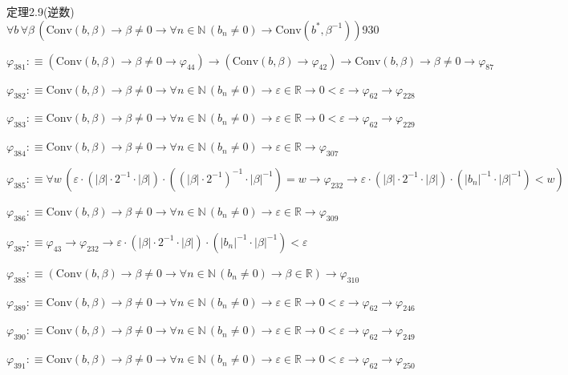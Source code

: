 \begin{fullproof}{定理2.9(逆数)}{$\forall b\,\forall \beta\,(\mathrm{Conv}(b,\beta) \to \beta \neq 0 \to \forall n \in \mathbb{N}\,(b_{n} \neq 0) \to \mathrm{Conv}(b^{\ast},\beta^{-1}))$}{930}
\begin{abbrevlist}
\item $\varphi_{381} :\equiv (\mathrm{Conv}(b,\beta) \to \beta \neq 0 \to \varphi_{44}) \to (\mathrm{Conv}(b,\beta) \to \varphi_{42}) \to \mathrm{Conv}(b,\beta) \to \beta \neq 0 \to \varphi_{87}$
\item $\varphi_{382} :\equiv \mathrm{Conv}(b,\beta) \to \beta \neq 0 \to \forall n \in \mathbb{N}\,(b_{n} \neq 0) \to \varepsilon \in \mathbb{R} \to 0 < \varepsilon \to \varphi_{62} \to \varphi_{228}$
\item $\varphi_{383} :\equiv \mathrm{Conv}(b,\beta) \to \beta \neq 0 \to \forall n \in \mathbb{N}\,(b_{n} \neq 0) \to \varepsilon \in \mathbb{R} \to 0 < \varepsilon \to \varphi_{62} \to \varphi_{229}$
\item $\varphi_{384} :\equiv \mathrm{Conv}(b,\beta) \to \beta \neq 0 \to \forall n \in \mathbb{N}\,(b_{n} \neq 0) \to \varepsilon \in \mathbb{R} \to \varphi_{307}$
\item $\varphi_{385} :\equiv \forall w\,(\varepsilon \cdot (\lvert \beta \rvert \cdot 2^{-1} \cdot \lvert \beta \rvert) \cdot ((\lvert \beta \rvert \cdot 2^{-1})^{-1} \cdot \lvert \beta \rvert^{-1}) = w \to \varphi_{232} \to \varepsilon \cdot (\lvert \beta \rvert \cdot 2^{-1} \cdot \lvert \beta \rvert) \cdot (\lvert b_{n} \rvert^{-1} \cdot \lvert \beta \rvert^{-1}) < w)$
\item $\varphi_{386} :\equiv \mathrm{Conv}(b,\beta) \to \beta \neq 0 \to \forall n \in \mathbb{N}\,(b_{n} \neq 0) \to \varepsilon \in \mathbb{R} \to \varphi_{309}$
\item $\varphi_{387} :\equiv \varphi_{43} \to \varphi_{232} \to \varepsilon \cdot (\lvert \beta \rvert \cdot 2^{-1} \cdot \lvert \beta \rvert) \cdot (\lvert b_{n} \rvert^{-1} \cdot \lvert \beta \rvert^{-1}) < \varepsilon$
\item $\varphi_{388} :\equiv (\mathrm{Conv}(b,\beta) \to \beta \neq 0 \to \forall n \in \mathbb{N}\,(b_{n} \neq 0) \to \beta \in \mathbb{R}) \to \varphi_{310}$
\item $\varphi_{389} :\equiv \mathrm{Conv}(b,\beta) \to \beta \neq 0 \to \forall n \in \mathbb{N}\,(b_{n} \neq 0) \to \varepsilon \in \mathbb{R} \to 0 < \varepsilon \to \varphi_{62} \to \varphi_{246}$
\item $\varphi_{390} :\equiv \mathrm{Conv}(b,\beta) \to \beta \neq 0 \to \forall n \in \mathbb{N}\,(b_{n} \neq 0) \to \varepsilon \in \mathbb{R} \to 0 < \varepsilon \to \varphi_{62} \to \varphi_{249}$
\item $\varphi_{391} :\equiv \mathrm{Conv}(b,\beta) \to \beta \neq 0 \to \forall n \in \mathbb{N}\,(b_{n} \neq 0) \to \varepsilon \in \mathbb{R} \to 0 < \varepsilon \to \varphi_{62} \to \varphi_{250}$

\end{abbrevlist}
\end{fullproof}
